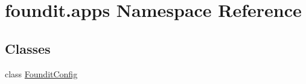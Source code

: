 \hypertarget{namespacefoundit_1_1apps}{}\section{foundit.\+apps Namespace Reference}
\label{namespacefoundit_1_1apps}
\subsection*{Classes}
\begin{DoxyCompactItemize}
\item 
class \hyperlink{classfoundit_1_1apps_1_1_foundit_config}{Foundit\+Config}
\end{DoxyCompactItemize}
